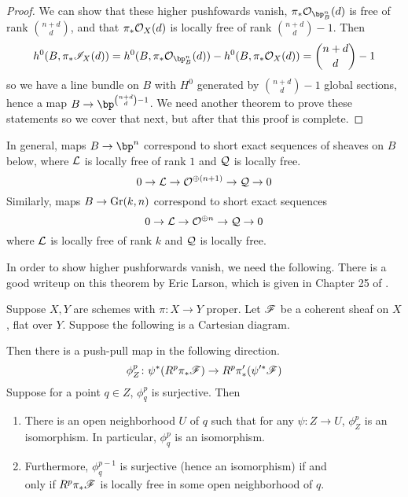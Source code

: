 \documentclass[12pt]{article}
\begin{document}
\begin{proof}
  We can show that these higher pushfowards vanish, $\pi_* \calo_{\bp^n_B}(d)$ is free of rank $\binom{n+d}{d}$, and that $\pi_* \mathcal{O}_X(d)$ is locally free of rank $\binom{n+d}{d} - 1$. Then 
  \[h^0(B, \pi_* \fani_X(d)) = h^0(B, \pi_* \calo_{\bp^n_B}(d)) - h^0(B, \pi_* \calo_X(d)) = \binom{n+d}{d} - 1\]
  so we have a line bundle on $B$ with $H^0$ generated by $\binom{n+d}{d} - 1$ global sections, hence a map $B \to \bp^{\binom{n+d}{d}-1}$. We need another theorem to prove these statements so we cover that next, but after that this proof is complete.
  
\end{proof}
In general, maps $B \to \bp^n$ correspond to short exact sequences of sheaves on $B$ below, where $\mathcal{L}$ is locally free of rank $1$ and $\mathcal{Q}$ is locally free.
\[0 \to \mathcal{L} \to \mathcal{O}^{\oplus (n+1)} \to \mathcal{Q} \to 0\]
Similarly, maps $B \to \operatorname{Gr}(k, n)$ correspond to short exact sequences 
\[0 \to \mathcal{L} \to \mathcal{O}^{\oplus n} \to \mathcal{Q} \to 0\]
where $\mathcal{L}$ is locally free of rank $k$ and $\mathcal{Q}$ is locally free.

In order to show higher pushforwards vanish, we need the following. There is a good writeup on this theorem by Eric Larson, which is given in Chapter 25 of \cite{V}.

\begin{thm}
  Suppose $X,Y$ are schemes with $\pi \colon X \to Y$ proper. Let $\mathscr{F}$ be a coherent sheaf on $X$, flat over $Y$. Suppose the following is a Cartesian diagram.
  \begin{center}
\end{center}
  Then there is a push-pull map in the following direction.
  \[\phi^p_Z \colon \psi^* (R^p \pi_* \mathscr{F}) \to R^p \pi'_*( \psi'^* \mathscr{F})\]
  Suppose for a point $q \in Z$, $\phi^p_q$ is surjective. Then
  \begin{enumerate}[label=(\roman*)]
      \item There is an open neighborhood $U$ of $q$ such that for any $\psi \colon Z \to U$, $\phi^p_Z$ is an isomorphism. In particular, $\phi^p_q$ is an isomorphism. 
      \item Furthermore, $\phi^{p-1}_{q}$ is surjective (hence an isomorphism) if and \\ only if $R^p \pi_* \mathscr{F}$ is locally free in some open neighborhood of $q$.
  \end{enumerate}
\end{thm}
\end{document}
